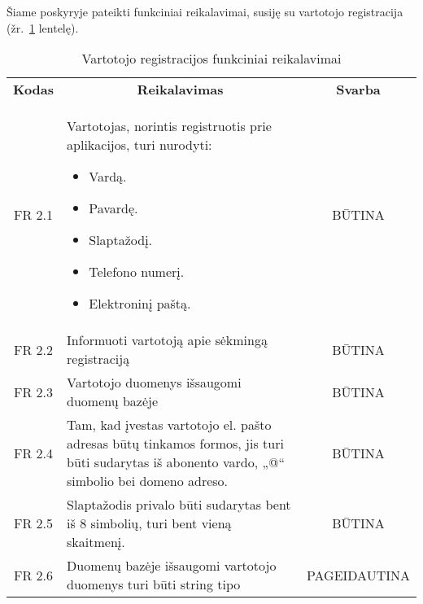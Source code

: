\documentclass{VUMIFPSkursinis}
\begin{document}
Šiame poskyryje pateikti funkciniai reikalavimai, susiję su vartotojo registracija (žr.~\ref{table:VartotojoRegistracija} lentelę).
\begin{center}

	\begin{table}[H]
	\begin{tabular}{|p{2cm}|p{}|p{}|}
	\hline
	    \rowcolor{lightgray}
		\multicolumn{3}{|c|}{Vartotojo registracija}\\
		
	\hline
		\multicolumn{1}{|c|}{{\bfseries Kodas}}&
		\multicolumn{1}{|c|}{{\bfseries Reikalavimas}}&
		\multicolumn{1}{|c|}{{\bfseries Svarba}}\\

	\hline
	\multicolumn{1}{|c|}{FR 2.1}&
	{Vartotojas, norintis registruotis prie aplikacijos, turi nurodyti:
		\begin{itemize}
			\item Vardą.
			\item Pavardę.
			\item Slaptažodį.
			\item Telefono numerį.
			\item Elektroninį paštą.
		\end{itemize}}&		
	\multicolumn{1}{|c|}{BŪTINA}\\
	\hline
	
		\multicolumn{1}{|c|}{FR 2.2}&
		{Informuoti vartotoją apie sėkmingą registraciją}&
		\multicolumn{1}{|c|}{BŪTINA}\\	
	\hline
		\multicolumn{1}{|c|}{FR 2.3}&
		{Vartotojo duomenys išsaugomi duomenų bazėje}&
		\multicolumn{1}{|c|}{BŪTINA}\\	
	\hline	
		\multicolumn{1}{|c|}{FR 2.4}&
		{Tam, kad įvestas vartotojo el. pašto adresas būtų tinkamos formos, jis turi būti sudarytas iš abonento vardo, „@“ simbolio bei domeno adreso.}&
		\multicolumn{1}{|c|}{BŪTINA}\\	
	\hline
		\multicolumn{1}{|c|}{FR 2.5}&
		{Slaptažodis privalo būti sudarytas bent iš 8 simbolių, turi bent vieną skaitmenį.
}&
		\multicolumn{1}{|c|}{BŪTINA}\\		
	\hline
		\multicolumn{1}{|c|}{FR 2.6}&
		{Duomenų bazėje išsaugomi vartotojo duomenys turi būti string tipo }&
		\multicolumn{1}{|p{1.5cm}|}{PAGEIDAUTINA}\\		
	\hline
	
	\end{tabular}
	\caption{Vartotojo registracijos funkciniai reikalavimai}
	\label{table:VartotojoRegistracija}
	\end{table}

\end{center}
\end{document}
